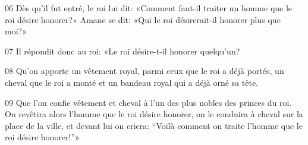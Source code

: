 
06 Dès qu’il fut entré, le roi lui dit: «Comment faut-il traiter un homme que le roi désire honorer?» Amane se dit: «Qui le roi désirerait-il honorer plus que moi?»

07 Il répondit donc au roi: «Le roi désire-t-il honorer quelqu’un?

08 Qu’on apporte un vêtement royal, parmi ceux que le roi a déjà portés, un cheval que le roi a monté et un bandeau royal qui a déjà orné sa tête.

09 Que l’on confie vêtement et cheval à l’un des plus nobles des princes du roi. On revêtira alors l’homme que le roi désire honorer, on le conduira à cheval sur la place de la ville, et devant lui on criera: “Voilà comment on traite l’homme que le roi désire honorer!”»
